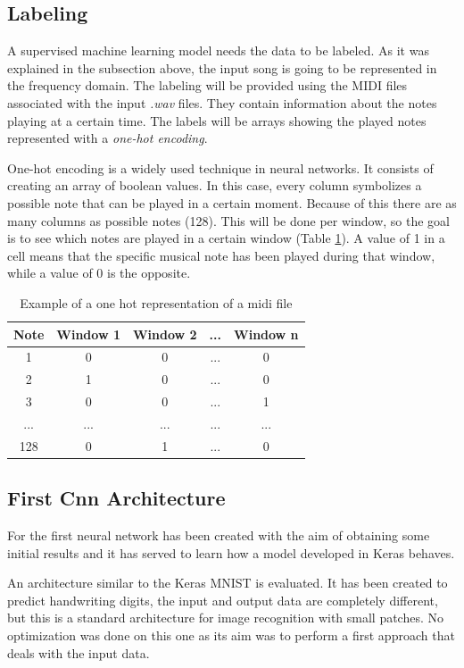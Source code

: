 \subsection{Labeling}
A supervised machine learning model needs the data to be labeled. As it was explained in the subsection above, the input song is going to be represented in the frequency domain. The labeling will be provided using the MIDI files associated with the input \textit{.wav} files. They contain information about the notes playing at a certain time. The labels will be arrays showing the played notes represented with a \textit{one-hot encoding}.
\par

One-hot encoding is a widely used technique in neural networks. It consists of creating an array of boolean values. \cite{one-hot} In this case, every column symbolizes a possible note that can be played in a certain moment. Because of this there are as many columns as possible notes (128). This will be done per window, so the goal is to see which notes are played in a certain window (Table \ref{table:one_hot}). A value of 1 in a cell means that the specific musical note has been played during that window, while a value of 0 is the opposite.

\begin{table}
	\centering
	\caption{Example of a one hot representation of a midi file}
	\begin{tabular}{||c c c c c||} 
		\hline
		Note & Window 1 & Window 2 & ... & Window n \\ [0.5ex] 
		\hline\hline
		1 & 0 & 0 & ... & 0 \\ 
		\hline
		2 & 1 & 0 & ... & 0 \\
		\hline
		3 & 0 & 0 & ... & 1 \\
		\hline
		... & ... & ... & ... & ... \\
		\hline
		128 & 0 & 1 & ... & 0 \\ [1ex] 
		\hline
	\end{tabular}
	\label{table:one_hot}
\end{table}

\subsection{First Cnn Architecture}
For the first neural network has been created with the aim of obtaining some initial results and it has served to learn how a model developed in Keras \cite{keras} behaves.
\par
An architecture similar to the Keras MNIST is evaluated\cite{keras_mnist}. It has been created to predict handwriting digits, the input and output data are completely different, but this is a standard architecture for image recognition with small patches. No optimization was done on this one as its aim was to perform a first approach that deals with the input data. 
\par

